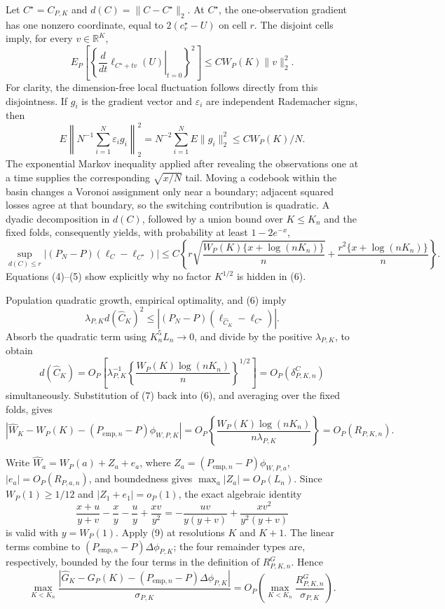 Let \(C^\star=C_{P,K}\) and \(d(C)=\|C-C^\star\|_2\).  At \(C^\star\), the one-observation gradient has one nonzero coordinate, equal to \(2(c_r^\star-U)\) on cell \(r\).  The disjoint cells imply, for every \(v\in\mathbb R^K\),
\[
 E_P\!\left[\left\{\left.\frac{d}{dt}\ell_{C^\star+tv}(U)\right|_{t=0}\right\}^2\right]
 \leq CW_P(K)\|v\|_2^2.                                                                \tag{4}
\]
For clarity, the dimension-free local fluctuation follows directly from this disjointness.  If \(g_i\) is the gradient vector and \(\varepsilon_i\) are independent Rademacher signs, then
\[
 E\left\|N^{-1}\sum_{i=1}^N\varepsilon_i g_i\right\|_2^2
 =N^{-2}\sum_{i=1}^NE\|g_i\|_2^2\leq CW_P(K)/N.                                      \tag{5}
\]
The exponential Markov inequality applied after revealing the observations one at a time supplies the corresponding \(\sqrt{x/N}\) tail.  Moving a codebook within the basin changes a Voronoi assignment only near a boundary; adjacent squared losses agree at that boundary, so the switching contribution is quadratic.  A dyadic decomposition in \(d(C)\), followed by a union bound over \(K\leq K_n\) and the fixed folds, consequently yields, with probability at least \(1-2e^{-x}\),
\[
 \sup_{d(C)\leq r}|(P_N-P)(\ell_C-\ell_{C^\star})|
 \leq C\left\{r\sqrt{\frac{W_P(K)\{x+\log(nK_n)\}}{n}}
 +\frac{r^2\{x+\log(nK_n)\}}{n}\right\}.                                             \tag{6}
\]
Equations (4)--(5) show explicitly why no factor \(K^{1/2}\) is hidden in (6).

Population quadratic growth, empirical optimality, and (6) imply
\[
 \lambda_{P,K}d(\widehat C_K)^2
 \leq |(P_N-P)(\ell_{\widehat C_K}-\ell_{C^\star})|.
\]
Absorb the quadratic term using \(K_n^5L_n\to0\), and divide by the positive \(\lambda_{P,K}\), to obtain
\[
 d(\widehat C_K)
 =O_P\!\left[\lambda_{P,K}^{-1}
 \left\{\frac{W_P(K)\log(nK_n)}{n}\right\}^{1/2}\right]
 =O_P(\delta^C_{P,K,n})                                                                 \tag{7}
\]
simultaneously.  Substitution of (7) back into (6), and averaging over the fixed folds, gives
\[
 \left|\widehat W_K-W_P(K)-(P_{\mathrm{emp},n}-P)\phi_{W,P,K}\right|
 =O_P\!\left\{\frac{W_P(K)\log(nK_n)}{n\lambda_{P,K}}\right\}
 =O_P(R_{P,K,n}).                                                                        \tag{8}
\]

Write \(\widehat W_a=W_P(a)+Z_a+e_a\), where
\(Z_a=(P_{\mathrm{emp},n}-P)\phi_{W,P,a}\), \(|e_a|=O_P(R_{P,a,n})\), and boundedness gives \(\max_a|Z_a|=O_P(L_n)\).  Since \(W_P(1)\geq1/12\) and \(|Z_1+e_1|=o_P(1)\), the exact algebraic identity
\[
 \frac{x+u}{y+v}-\frac{x}{y}-\frac{u}{y}+\frac{xv}{y^2}
 =-\frac{uv}{y(y+v)}+\frac{xv^2}{y^2(y+v)}                                               \tag{9}
\]
is valid with \(y=W_P(1)\).  Apply (9) at resolutions \(K\) and \(K+1\).  The linear terms combine to \((P_{\mathrm{emp},n}-P)\Delta\phi_{P,K}\); the four remainder types are, respectively, bounded by the four terms in the definition of \(R^G_{P,K,n}\).  Hence
\[
 \max_{K<K_n}\frac{|\widehat G_K-G_P(K)-(P_{\mathrm{emp},n}-P)\Delta\phi_{P,K}|}
 {\sigma_{P,K}}
 =O_P\!\left(\max_{K<K_n}\frac{R^G_{P,K,n}}{\sigma_{P,K}}\right).                     \tag{10}
\]

